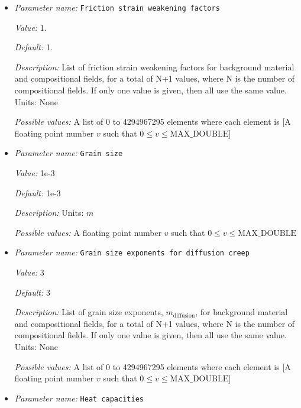 \begin{itemize}
{\it Possible values:} A list of 0 to 4294967295 elements where each element is [A floating point number $v$ such that $0 \leq v \leq \text{MAX\_DOUBLE}$]
\item {\it Parameter name:} {\tt Friction strain weakening factors}
\label{parameters:Material model/Visco Plastic/Friction strain weakening factors}


{\it Value:} 1.


{\it Default:} 1.


{\it Description:} List of friction strain weakening factors for background material and compositional fields, for a total of N+1 values, where N is the number of compositional fields. If only one value is given, then all use the same value.  Units: None


{\it Possible values:} A list of 0 to 4294967295 elements where each element is [A floating point number $v$ such that $0 \leq v \leq \text{MAX\_DOUBLE}$]
\item {\it Parameter name:} {\tt Grain size}
\label{parameters:Material model/Visco Plastic/Grain size}


{\it Value:} 1e-3


{\it Default:} 1e-3


{\it Description:} Units: $m$


{\it Possible values:} A floating point number $v$ such that $0 \leq v \leq \text{MAX\_DOUBLE}$
\item {\it Parameter name:} {\tt Grain size exponents for diffusion creep}
\label{parameters:Material model/Visco Plastic/Grain size exponents for diffusion creep}


{\it Value:} 3


{\it Default:} 3


{\it Description:} List of grain size exponents, $m_{\text{diffusion}}$, for background material and compositional fields, for a total of N+1 values, where N is the number of compositional fields. If only one value is given, then all use the same value. Units: None


{\it Possible values:} A list of 0 to 4294967295 elements where each element is [A floating point number $v$ such that $0 \leq v \leq \text{MAX\_DOUBLE}$]
\item {\it Parameter name:} {\tt Heat capacities}
\label{parameters:Material model/Visco Plastic/Heat capacities}



\end{itemize}
